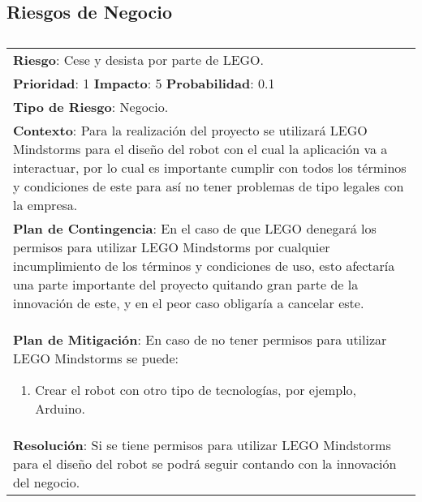 \subsection{Riesgos de Negocio}
\begin{table}[htbp!]
  \begin{tabular}{|p{15cm}|}\hline
    {\bf Riesgo}: Cese y desista por parte de LEGO.\\%
    {\bf Prioridad}: 1  {\bf Impacto}: 5  {\bf Probabilidad}: 0.1\\%
    {\bf Tipo de Riesgo}: Negocio.\\%
    {\bf Contexto}: Para la realizaci\'on del proyecto  se utilizar\'a LEGO Mindstorms para el dise\~no del robot con el cual la aplicaci\'on va a interactuar, por lo cual es importante cumplir con todos los t\'erminos y condiciones de este para as\'i no tener problemas de tipo legales con la empresa.\\%
    {\bf Plan de Contingencia}: En el caso de que LEGO denegar\'a los permisos para utilizar LEGO Mindstorms por cualquier incumplimiento de los t\'erminos y condiciones de uso, esto afectar\'ia una parte importante del proyecto quitando gran parte de la innovaci\'on de este, y en el peor caso obligar\'ia a cancelar este.\\%
    {\bf Plan de Mitigaci\'on}: En caso de no tener permisos para utilizar LEGO Mindstorms se puede:\begin{enumerate}\item Crear el robot con otro tipo de tecnolog\'ias, por ejemplo, Arduino.\end{enumerate}\\%
    {\bf Resoluci\'on}: Si se tiene permisos para utilizar LEGO Mindstorms para el dise\~no del robot se podr\'a seguir contando con la innovaci\'on del negocio.\\\hline
  \end{tabular}
  \caption{}
  \label{table:R9}
\end{table}




